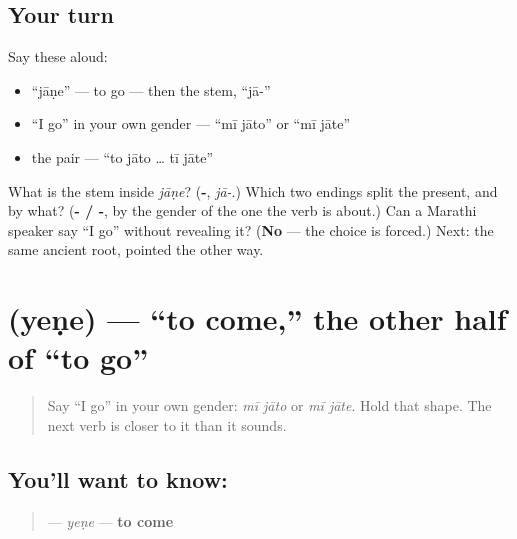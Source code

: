 \subsection*{Your turn}
Say these aloud:

\begin{itemize}
\raggedright
  \item \textquotedblleft{}jāṇe\textquotedblright{} — to go — then the stem, \textquotedblleft{}jā-\textquotedblright{}
  \item \textquotedblleft{}I go\textquotedblright{} in your own gender — \textquotedblleft{}mī jāto\textquotedblright{} or \textquotedblleft{}mī jāte\textquotedblright{}
  \item the pair — \textquotedblleft{}to jāto … tī jāte\textquotedblright{}
\end{itemize}

\begin{tcolorbox}[breakable,colback=teal!4,colframe=teal!35!black,title={Before you move on}]
What is the stem inside \emph{jāṇe}? (\textbf{-}, \emph{jā-}.) Which two endings split the present, and by what? (\textbf{- / -}, by the gender of the one the verb is about.) Can a Marathi speaker say \textquotedblleft{}I go\textquotedblright{} without revealing it? (\textbf{No} — the choice is forced.) Next: the same ancient root, pointed the other way.
\end{tcolorbox}
\section[\texorpdfstring{\mr{येणे} (yeṇe)}{येणे (yeṇe)}]{ (yeṇe) — \textquotedblleft{}to come,\textquotedblright{} the other half of \textquotedblleft{}to go\textquotedblright{}}

\label{lesson:MR-C07-yene}



\begin{quote}
Say \textquotedblleft{}I go\textquotedblright{} in your own gender: \emph{mī jāto} or \emph{mī jāte}. Hold that shape. The next verb is closer to it than it sounds.
\end{quote}

\subsection*{You'll want to know: }
\begin{quote}
\textbf{} — \emph{yeṇe} — \textbf{to come}
\end{quote}

